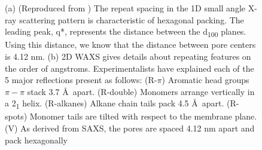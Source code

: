 \documentclass[journal=jpcbfk,manusciprt=article]{achemso}
\begin{document}
\begin{figure}
	\caption{(a) (Reproduced from \cite{feng_thin_2016}) The repeat spacing
		in the 1D small angle X-ray scattering pattern is characteristic of hexagonal
		packing. The leading peak, q*, represents the distance between the
		d\textsubscript{100} planes. Using this distance, we know that the distance
		between pore centers is 4.12 nm. (b) 2D WAXS gives
		details about repeating features on the order of angstroms. Experimentalists
		have explained each of the 5 major reflections present as follows: (R-$\pi$) Aromatic
		head groups $\pi-\pi$ stack 3.7 \AA~apart. (R-double) Monomers arrange vertically in
		a 2\textsubscript{1} helix. (R-alkanes) Alkane chain tails pack 4.5 \AA~apart. (R-spots)
		Monomer tails are tilted with respect to the membrane plane. (V) As derived from
		SAXS, the pores are spaced 4.12 nm apart and pack hexagonally}
	\label{fig:SWAXS}
 \end{figure}
  
\end{document}
